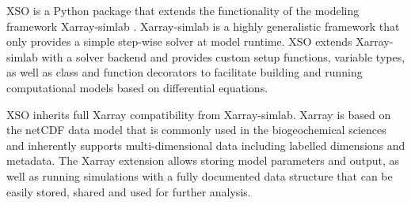 \documentclass[journal abbreviation, manuscript]{copernicus}
\begin{document}
XSO is a Python package that extends the functionality of the modeling framework Xarray-simlab \citep{Bovy2018Xarray-simlab:Interactively}. Xarray-simlab is a highly generalistic framework that only provides a simple step-wise solver at model runtime. XSO extends Xarray-simlab with a solver backend and provides custom setup functions, variable types, as well as class and function decorators to facilitate building and running computational models based on differential equations. 

XSO inherits full Xarray compatibility from Xarray-simlab. Xarray is based on the netCDF data model that is commonly used in the biogeochemical sciences and inherently supports multi-dimensional data including labelled dimensions and metadata. The Xarray extension allows storing model parameters and output, as well as running simulations with a fully documented data structure that can be easily stored, shared and used for further analysis.
\end{document}
